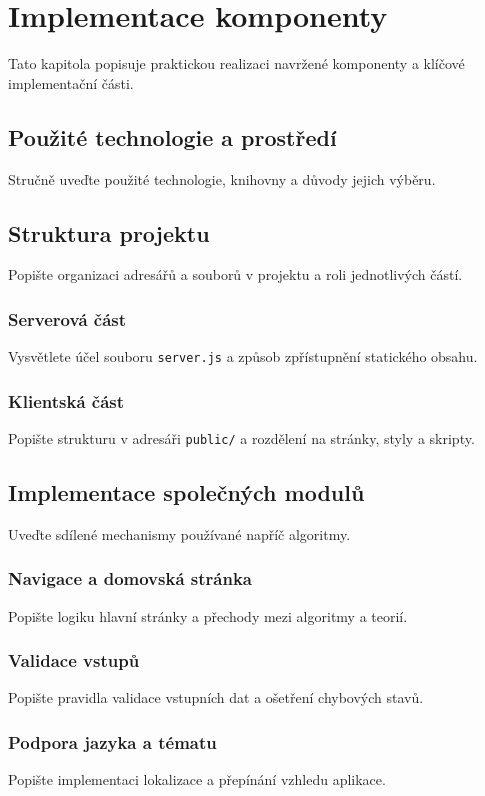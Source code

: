 \chapter{Implementace komponenty}

Tato kapitola popisuje praktickou realizaci navržené komponenty a klíčové implementační části.

\section{Použité technologie a prostředí}
Stručně uveďte použité technologie, knihovny a důvody jejich výběru.

\section{Struktura projektu}
Popište organizaci adresářů a souborů v projektu a roli jednotlivých částí.

\subsection{Serverová část}
Vysvětlete účel souboru \texttt{server.js} a způsob zpřístupnění statického obsahu.

\subsection{Klientská část}
Popište strukturu v adresáři \texttt{public/} a rozdělení na stránky, styly a skripty.

\section{Implementace společných modulů}
Uveďte sdílené mechanismy používané napříč algoritmy.

\subsection{Navigace a domovská stránka}
Popište logiku hlavní stránky a přechody mezi algoritmy a teorií.

\subsection{Validace vstupů}
Popište pravidla validace vstupních dat a ošetření chybových stavů.

\subsection{Podpora jazyka a tématu}
Popište implementaci lokalizace a přepínání vzhledu aplikace.

